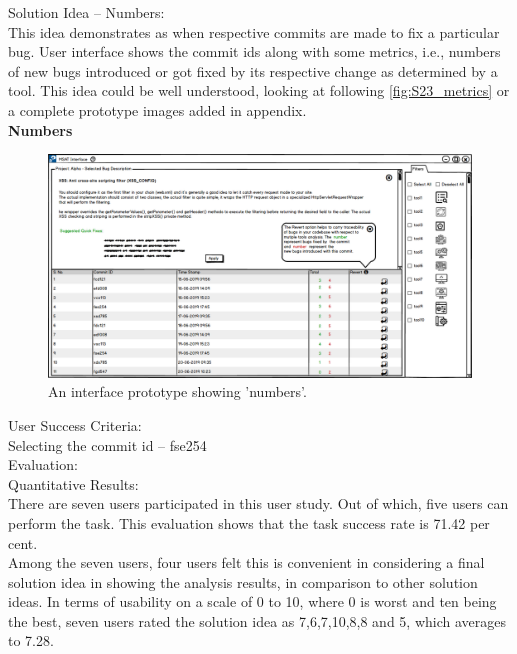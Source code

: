 Solution Idea – Numbers: \\

This idea demonstrates as when respective commits are made to fix a particular bug. User interface shows the commit ids along with some metrics, i.e., numbers of new bugs introduced or got fixed by its respective change as determined by a tool. This idea could be well understood, looking at following \autoref{fig:S23_metrics} or a complete prototype images added in appendix. \\

\textbf{Numbers}
\begin{figure}[hbt!]
	\centering
	\includegraphics[width=\linewidth]{figures/solution_ideas_snaps/S23_metrics}
	\caption{An interface prototype showing 'numbers'.}
	\label{fig:S23_metrics}
\end{figure}

User Success Criteria: \\

Selecting the commit id – fse254 \\

Evaluation: \\

Quantitative Results: \\

There are seven users participated in this user study. Out of which, five users can perform the task. This evaluation shows that the task success rate is 71.42 per cent. \\

Among the seven users, four users felt this is convenient in considering a final solution idea in showing the analysis results, in comparison to other solution ideas. In terms of usability on a scale of 0 to 10, where 0 is worst and ten being the best, seven users rated the solution idea as 7,6,7,10,8,8 and 5, which averages to 7.28. \\


